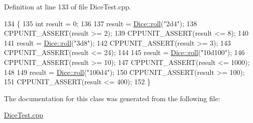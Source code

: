 Definition at line 133 of file Dice\+Test.\+cpp.


\begin{DoxyCode}
134 \{
135     \textcolor{keywordtype}{int} result = 0;
136 
137     result = \hyperlink{class_dice_a7428dd940e0af226820414ca07147771}{Dice::roll}(\textcolor{stringliteral}{"2d4"});
138     CPPUNIT\_ASSERT(result >= 2);
139     CPPUNIT\_ASSERT(result <= 8);
140 
141     result = \hyperlink{class_dice_a7428dd940e0af226820414ca07147771}{Dice::roll}(\textcolor{stringliteral}{"3d8"});
142     CPPUNIT\_ASSERT(result >= 3);
143     CPPUNIT\_ASSERT(result <= 24);
144 
145     result = \hyperlink{class_dice_a7428dd940e0af226820414ca07147771}{Dice::roll}(\textcolor{stringliteral}{"10d100"});
146     CPPUNIT\_ASSERT(result >= 10);
147     CPPUNIT\_ASSERT(result <= 1000);
148 
149     result = \hyperlink{class_dice_a7428dd940e0af226820414ca07147771}{Dice::roll}(\textcolor{stringliteral}{"100d4"});
150     CPPUNIT\_ASSERT(result >= 100);
151     CPPUNIT\_ASSERT(result <= 400);
152 \}
\end{DoxyCode}


The documentation for this class was generated from the following file\+:\begin{DoxyCompactItemize}
\item 
\hyperlink{_dice_test_8cpp}{Dice\+Test.\+cpp}\end{DoxyCompactItemize}
